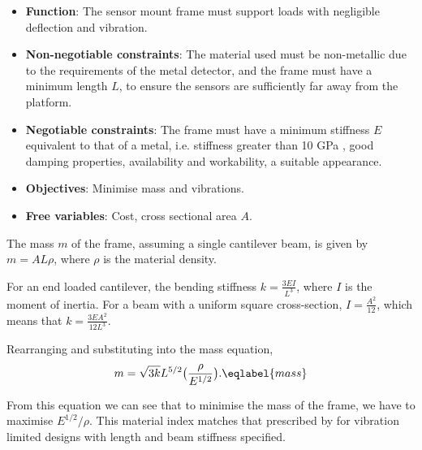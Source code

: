 \documentclass[main.tex]{subfiles}
\begin{document}
\begin{appendices}
\begin{itemize}
\item \textbf{Function}: The sensor mount frame must support loads with negligible deflection and vibration.
\item \textbf{Non-negotiable constraints}: The material used must be non-metallic due to the requirements of the metal detector, and the  frame must have a minimum length $L$, to ensure the sensors are sufficiently far away from the platform.
\item \textbf{Negotiable constraints}: The frame must have a minimum stiffness $E$ equivalent to that of a metal, i.e. stiffness greater than 10 GPa \parencite{Ashby11}, good damping properties, availability and workability, a suitable appearance.
\item \textbf{Objectives}: Minimise mass and vibrations.
\item \textbf{Free variables}: Cost, cross sectional area $A$.
\end{itemize}

The mass $m$ of the frame, assuming a single cantilever beam, is given by $m=AL\rho$, where $\rho$ is the material density. 

For an end loaded cantilever, the bending stiffness $k=\frac{3EI}{L^3}$, where $I$ is the moment of inertia. For a beam with a uniform square cross-section, $I=\frac{A^2}{12}$, which means that $k=\frac{3EA^2}{12L^3}$.

Rearranging and substituting into the mass equation, 
\begin{align}
m=\sqrt{3k}L^{5/2}\big(\frac{\rho}{E^{1/2}}\big).	\eqlabel{mass}
\end{align}

From this equation we can see that to minimise the mass of the frame, we have to maximise $E^{1/2}/\rho$. This material index matches that prescribed by \textcite{Ashby11} for vibration limited designs with length and beam stiffness specified.  


\end{appendices}
\end{document}
